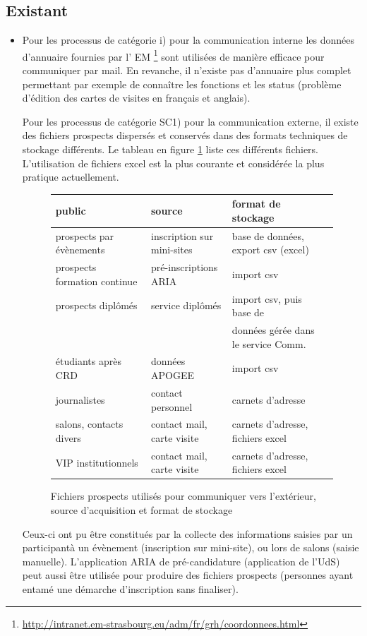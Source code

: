 \documentclass{book}
\begin{document}
\subsection{Existant}
\begin{itemize}
\item Pour les processus de catégorie i) pour la communication interne
	les données d'annuaire fournies par l' EM %
	\footnote{\url{http://intranet.em-strasbourg.eu/adm/fr/grh/coordonnees.html}}
	sont utilisées de manière efficace pour communiquer par mail.
	En revanche, il n'existe pas d'annuaire plus complet permettant
	par exemple de connaître les fonctions et les status  (problème d'édition des 
	cartes de visites en français et anglais).


	Pour les processus de catégorie SC1) pour la communication externe,
	il existe des fichiers prospects dispersés et conservés dans des 
	formats techniques de stockage différents. Le tableau en figure 
	\ref{fg:comm_prospects} liste ces différents fichiers.
	L'utilisation de fichiers excel est la plus courante et considérée 
	la plus pratique actuellement.

\begin{figure}[hbt]
\begin{center}
	\begin{tabular}{llll}
	\hline
	\hline
	public	& source	 & format de stockage \\
	\hline
	prospects par évènements & inscription sur  mini-sites &  base de données, export csv (excel)\\
	prospects formation continue  & pré-inscriptions ARIA & import csv \\
	prospects diplômés      & service diplômés &  import csv, puis base de \\
					&			 &  données gérée dans le service Comm. \\
	étudiants après CRD 	& données APOGEE & import csv \\
	journalistes 		& contact personnel	& carnets d'adresse \\
	salons, contacts divers	& contact mail, carte visite & carnets d'adresse, fichiers excel\\ 
	VIP institutionnels	& contact mail, carte visite & carnets d'adresse, fichiers excel\\ 
	\hline
	\hline
	\end{tabular}
\end{center}
\caption{Fichiers prospects utilisés pour communiquer vers l'extérieur, source 
	d'acquisition et format de stockage}
\label{fg:comm_prospects}
\end{figure}
	Ceux-ci  ont pu être constitués par la collecte des informations saisies 
	par un participantà un évènement (inscription sur mini-site), ou lors de 
      salons (saisie manuelle). L'application ARIA de pré-candidature (application de l'UdS)
      peut aussi être utilisée pour produire des fichiers prospects (personnes 
	ayant entamé une démarche d'inscription sans finaliser).


\end{itemize}
\end{document}
